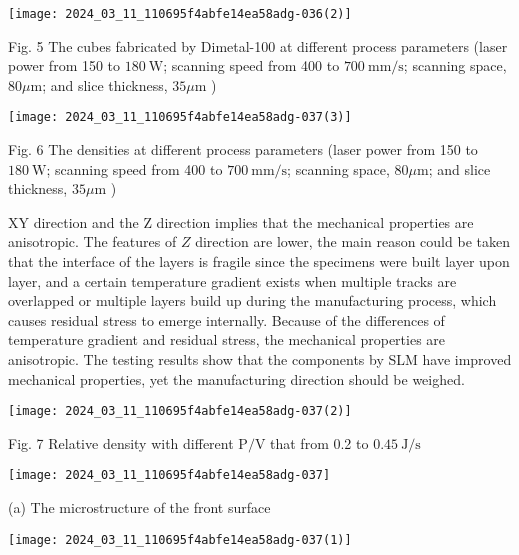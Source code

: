 \documentclass[10pt]{article}
\begin{document}
\begin{center}
\texttt{[image: 2024\_03\_11\_110695f4abfe14ea58adg-036(2)]}
\end{center}

Fig. 5 The cubes fabricated by Dimetal-100 at different process parameters (laser power from 150 to $180 \mathrm{~W}$; scanning speed from 400 to $700 \mathrm{~mm} / \mathrm{s}$; scanning space, $80 \mu \mathrm{m}$; and slice thickness, $35 \mu \mathrm{m}$ )

\begin{center}
\texttt{[image: 2024\_03\_11\_110695f4abfe14ea58adg-037(3)]}
\end{center}

Fig. 6 The densities at different process parameters (laser power from 150 to $180 \mathrm{~W}$; scanning speed from 400 to $700 \mathrm{~mm} / \mathrm{s}$; scanning space, $80 \mu \mathrm{m}$; and slice thickness, $35 \mu \mathrm{m}$ )

$\mathrm{XY}$ direction and the $\mathrm{Z}$ direction implies that the mechanical properties are anisotropic. The features of $Z$ direction are lower, the main reason could be taken that the interface of the layers is fragile since the specimens were built layer upon layer, and a certain temperature gradient exists when multiple tracks are overlapped or multiple layers build up during the manufacturing process, which causes residual stress to emerge internally. Because of the differences of temperature gradient and residual stress, the mechanical properties are anisotropic. The testing results show that the components by SLM have improved mechanical properties, yet the manufacturing direction should be weighed.

\begin{center}
\texttt{[image: 2024\_03\_11\_110695f4abfe14ea58adg-037(2)]}
\end{center}

Fig. 7 Relative density with different $\mathrm{P} / \mathrm{V}$ that from 0.2 to $0.45 \mathrm{~J} / \mathrm{s}$

\begin{center}
\texttt{[image: 2024\_03\_11\_110695f4abfe14ea58adg-037]}
\end{center}

(a) The microstructure of the front surface

\begin{center}
\texttt{[image: 2024\_03\_11\_110695f4abfe14ea58adg-037(1)]}
\end{center}
\end{document}
